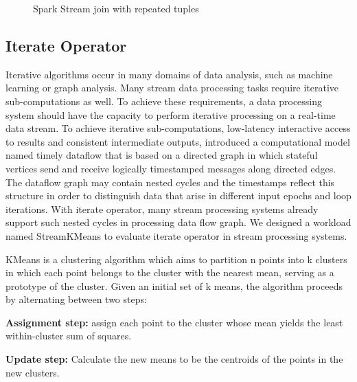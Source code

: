 \begin{figure}
  \begin{center}
   \caption{Spark Stream join with repeated tuples}
   \label{fig:spark_join_repeat}
  \end{center}
\end{figure}

\subsection{Iterate Operator}

Iterative algorithms occur in many domains of data analysis, such as machine learning or graph analysis. Many stream data processing tasks require iterative sub-computations as well. To achieve these requirements, a data processing system should have the capacity to perform iterative processing on a real-time data stream. To achieve iterative sub-computations,  low-latency interactive access to results and consistent intermediate outputs, \citeauthor{murray2013naiad} introduced a computational model named timely dataflow that is based on a directed graph in which stateful vertices send and receive logically timestamped messages along directed edges. \cite{murray2013naiad} The dataflow graph may contain nested cycles and the timestamps reflect this structure in order to distinguish data that arise in different input epochs and loop iterations. With iterate operator, many stream processing systems already support such nested cycles in processing data flow graph. We designed a workload named StreamKMeans to evaluate iterate operator in stream processing systems.

KMeans is a clustering algorithm which aims to partition n points into k clusters in which each point belongs to the cluster with the nearest mean, serving as a prototype of the cluster.\cite{kmeans_wiki} Given an initial set of k means, the algorithm proceeds by alternating between two steps: \cite{mackay2003information}
\begin{description}
\item\textbf{Assignment step:} assign each point to the cluster whose mean yields the least within-cluster sum of squares.
\item \textbf{Update step:} Calculate the new means to be the centroids of the points in the new clusters.
\end{description}

